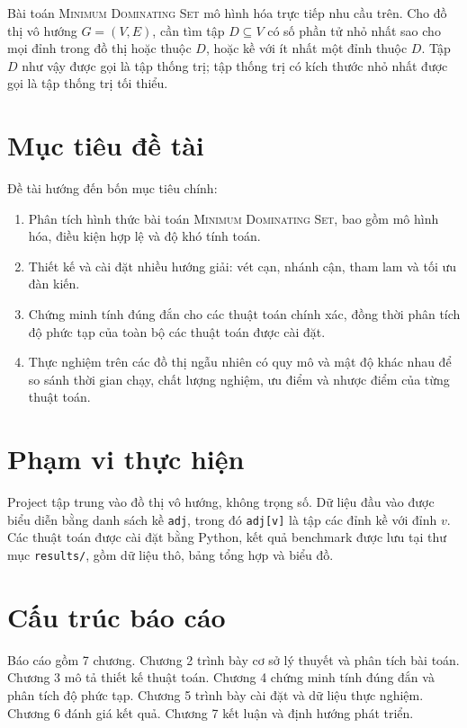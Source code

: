 \documentclass[12pt, a4paper]{report}
\newcommand{\MDS}{\textsc{Minimum Dominating Set}}
\begin{document}
Bài toán \MDS{} mô hình hóa trực tiếp nhu cầu trên. Cho đồ thị vô hướng $G=(V,E)$, cần tìm tập
$D \subseteq V$ có số phần tử nhỏ nhất sao cho mọi đỉnh trong đồ thị hoặc thuộc $D$, hoặc kề với ít nhất
một đỉnh thuộc $D$. Tập $D$ như vậy được gọi là tập thống trị; tập thống trị có kích thước nhỏ nhất được
gọi là tập thống trị tối thiểu.

\section{Mục tiêu đề tài}

Đề tài hướng đến bốn mục tiêu chính:

\begin{enumerate}[leftmargin=*, label=\arabic*.]
  \item Phân tích hình thức bài toán \MDS{}, bao gồm mô hình hóa, điều kiện hợp lệ và độ khó tính toán.
  \item Thiết kế và cài đặt nhiều hướng giải: vét cạn, nhánh cận, tham lam và tối ưu đàn kiến.
  \item Chứng minh tính đúng đắn cho các thuật toán chính xác, đồng thời phân tích độ phức tạp của
    toàn bộ các thuật toán được cài đặt.
  \item Thực nghiệm trên các đồ thị ngẫu nhiên có quy mô và mật độ khác nhau để so sánh thời gian chạy,
    chất lượng nghiệm, ưu điểm và nhược điểm của từng thuật toán.
\end{enumerate}

\section{Phạm vi thực hiện}

Project tập trung vào đồ thị vô hướng, không trọng số. Dữ liệu đầu vào được biểu diễn bằng danh sách kề
\texttt{adj}, trong đó \texttt{adj[v]} là tập các đỉnh kề với đỉnh $v$. Các thuật toán được cài đặt bằng
Python, kết quả benchmark được lưu tại thư mục \texttt{results/}, gồm dữ liệu thô, bảng tổng hợp và biểu đồ.

\section{Cấu trúc báo cáo}

Báo cáo gồm 7 chương. Chương 2 trình bày cơ sở lý thuyết và phân tích bài toán. Chương 3 mô tả thiết
kế thuật toán. Chương 4 chứng minh tính đúng đắn và phân tích độ phức tạp. Chương 5 trình bày cài đặt
và dữ liệu thực nghiệm. Chương 6 đánh giá kết quả. Chương 7 kết luận và định hướng phát triển.
\end{document}
